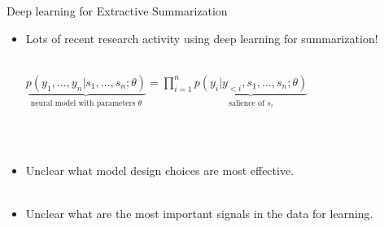 \begin{frame}{Deep learning for Extractive Summarization}

  \begin{itemize}
    \item Lots of recent research activity using deep learning for
              summarization!  \\~\\
              
            \begin{center}$\underbrace{p(y_1,\ldots,y_n|s_1,\ldots,s_n;\theta)}_{\text{neural model with parameters $\theta$}}=\prod_{i=1}^n \underbrace{p(y_i|y_{<i},s_1,\ldots,s_n;\theta)}_{\text{salience of $s_i$}}$ \end{center}

              ~\\
              ~\\
    \item Unclear what model design choices are most effective.\\
              ~\\
    \item Unclear what are the most important signals in the data for
              learning.\\
  \end{itemize}

\end{frame}


